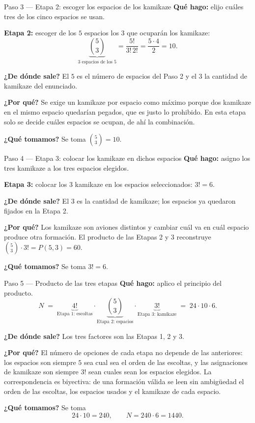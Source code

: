 \documentclass[11pt]{article}
\begin{document}
\begin{paso}{Paso 3 --- Etapa 2: escoger los espacios de los kamikaze}
\textbf{Qué hago:} elijo cuáles tres de los cinco espacios se usan.

\medskip
\textbf{Etapa 2:} escoger de los $5$ espacios los $3$ que ocuparán los kamikaze:
\[
  \underbrace{\binom{5}{3}}_{\text{3 espacios de los 5}} = \frac{5!}{3!\,2!} = \frac{5\cdot 4}{2} = 10 .
\]

\textbf{¿De dónde sale?} El $5$ es el número de espacios del Paso 2 y el $3$ la cantidad de kamikaze del enunciado.

\textbf{¿Por qué?} Se exige un kamikaze por espacio como máximo porque dos kamikaze en el mismo espacio quedarían pegados, que es justo lo prohibido. En esta etapa solo se decide cuáles espacios se ocupan, de ahí la combinación.

\textbf{¿Qué tomamos?} Se toma $\binom{5}{3}=10$.
\end{paso}

\begin{paso}{Paso 4 --- Etapa 3: colocar los kamikaze en dichos espacios}
\textbf{Qué hago:} asigno los tres kamikaze a los tres espacios elegidos.

\medskip
\textbf{Etapa 3:} colocar los $3$ kamikaze en los espacios seleccionados: $3!=6$.

\textbf{¿De dónde sale?} El $3$ es la cantidad de kamikaze; los espacios ya quedaron fijados en la Etapa 2.

\textbf{¿Por qué?} Los kamikaze son aviones distintos y cambiar cuál va en cuál espacio produce otra formación. El producto de las Etapas 2 y 3 reconstruye $\binom{5}{3}\cdot 3! = P(5,3) = 60$.

\textbf{¿Qué tomamos?} Se toma $3!=6$.
\end{paso}

\begin{paso}{Paso 5 --- Producto de las tres etapas}
\textbf{Qué hago:} aplico el principio del producto.
\[
  N \;=\; \underbrace{4!}_{\text{Etapa 1: escoltas}} \cdot \underbrace{\binom{5}{3}}_{\text{Etapa 2: espacios}} \cdot \underbrace{3!}_{\text{Etapa 3: kamikaze}} \;=\; 24\cdot 10\cdot 6 .
\]

\textbf{¿De dónde sale?} Los tres factores son las Etapas 1, 2 y 3.

\textbf{¿Por qué?} El número de opciones de cada etapa no depende de las anteriores: los espacios son siempre $5$ sea cual sea el orden de las escoltas, y las asignaciones de kamikaze son siempre $3!$ sean cuales sean los espacios elegidos. La correspondencia es biyectiva: de una formación válida se leen sin ambigüedad el orden de las escoltas, los espacios usados y el kamikaze de cada espacio.

\textbf{¿Qué tomamos?} Se toma
\[
  24\cdot 10 = 240,\qquad N = 240\cdot 6 = 1440 .
\]
\end{paso}
\end{document}
